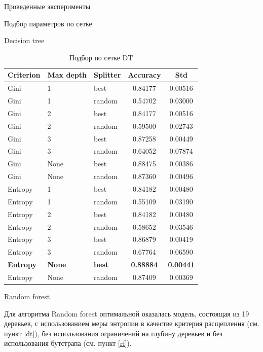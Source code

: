 \begin{section}{Проведенные эксперименты}
\begin{subsection}{Подбор параметров по сетке}
\begin{subsubsection}{Decision tree}
\begin{table}[H]
\centering
{\begin{tabular}{|l|l|l|c|c|}
\hline
\textbf{Criterion} & \textbf{Max depth} & \textbf{Splitter} & \textbf{Accuracy} & \textbf{Std} \\
\hline
Gini & 1  & best & 0.84177 & 0.00516 \\
\hline
Gini & 1  & random &  0.54702 & 0.03000 \\
\hline
Gini & 2  & best & 0.84177 & 0.00516 \\
\hline
Gini &  2 & random  & 0.59500 & 0.02743 \\
\hline
Gini & 3  & best & 0.87258 & 0.00449 \\
\hline
Gini & 3  & random & 0.64052 & 0.07874 \\
\hline
Gini & None  & best & 0.88475 & 0.00386 \\
\hline
Gini &  None & random  & 0.87360 & 0.00496 \\
\hline
Entropy & 1  & best & 0.84182 & 0.00480 \\
\hline
Entropy & 1  & random & 0.55109 & 0.03190 \\
\hline
Entropy  & 2  & best & 0.84182 & 0.00480 \\
\hline
Entropy  &  2 & random  & 0.58652 & 0.03546 \\
\hline
Entropy  & 3  & best &  0.86879 & 0.00419 \\
\hline
Entropy  & 3  & random & 0.67764 & 0.06590 \\
\hline
\textbf{Entropy} & \textbf{None}  & \textbf{best} & \textbf{0.88884} & \textbf{0.00441} \\
\hline
Entropy &  None & random  & 0.87409 & 0.00369 \\
\hline
\end{tabular}}

\caption{Подбор по сетке DT}
\label{grid:dt}
\end{table}


\end{subsubsection}


\begin{subsubsection}{Random forest}

Для алгоритма Random forest оптимальной оказалась модель, состоящая из 19 деревьев, с использованием меры энтропии в качестве критерия расщепления (см. пункт \ref{dt}), без использования ограничений на глубину деревьев и без использования бутстрапа (см. пункт \ref{rf}).


\end{subsubsection}
\end{subsection}
\end{section}
